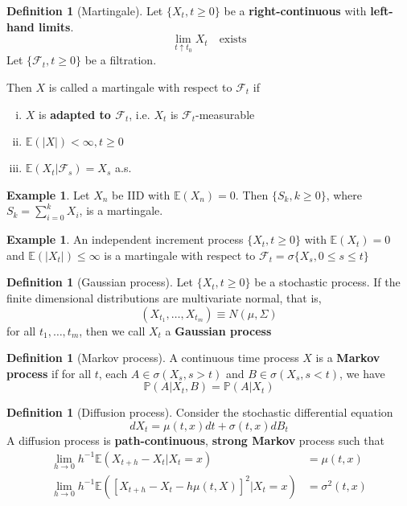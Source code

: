 \documentclass[10pt, oneside, reqno]{amsart}
\theoremstyle{plain}%
\theoremstyle{definition}
\newtheorem{defn}[thm]{Definition}
\newtheorem{exmp}[thm]{Example}
\theoremstyle{remark}
\renewcommand{\P}{\mathbb{P}}
\newcommand{\E}{\mathbb{E}}
\newcommand{\sigf}{\mathcal{F}}
\begin{document}
\begin{defn}[Martingale]
    Let $\{ X_t, t \geq 0 \}$ be a \textbf{right-continuous} with \textbf{left-hand limits}.  \[
        \lim_{t \uparrow t_0} X_t \quad \text{exists}
    \]
    Let $\{\sigf_t, t \geq 0 \} $ be a filtration.  
    
    Then $X$ is called a martingale with respect to $\sigf_t$ if 
    \begin{enumerate}[(i)]
        \item $X$ is \textbf{adapted to $\sigf_t$}, i.e. $X_t$ is $\sigf_t$-measurable
        \item $\E(|X|) < \infty, t \geq 0$
        \item $\E(X_t | \sigf_s) = X_s$ a.s.
    \end{enumerate}
\end{defn}

\begin{exmp}
    Let $X_n$ be IID with $\E(X_n) = 0$.  Then $\{ S_k, k \geq 0 \}$, where $S_k = \sum_{i = 0}^k X_i$, is a martingale.
\end{exmp}

\begin{exmp}
    An independent increment process $\{ X_t, t \geq 0 \}$ with $\E(X_t) = 0$ and $\E(|X_t|) \leq \infty$ is a martingale with respect to $\sigf_t = \sigma\{ X_s, 0 \leq s \leq t \}$
\end{exmp}

\begin{defn}[Gaussian process]
    Let $\{ X_t, t \geq 0 \}$ be a stochastic process.  If the finite dimensional distributions are multivariate normal, that is,\[
        (X_{t_1}, \dots, X_{t_m}) \equiv N(\mu, \Sigma)
    \]
    for all $t_1, \dots, t_m$, then we call $X_t$ a \textbf{Gaussian process}
\end{defn}

\begin{defn}[Markov process]
    A continuous time process $X$ is a \textbf{Markov process} if for all $t$, each $A \in \sigma( X_s, s > t)$ and $B \in \sigma( X_s, s < t)$, we have \[
        \P(A|X_t, B) = \P(A | X_t)
    \]
\end{defn}

\begin{defn}[Diffusion process]
    Consider the stochastic differential equation \[
    dX_t = \mu(t, x) dt + \sigma(t,x) dB_t
    \]
    A diffusion process is \textbf{path-continuous}, \textbf{strong Markov} process such that
    \begin{align*}
        \lim_{h \rightarrow 0} h^{-1} \E( X_{t+h} - X_t | X_t = x) &= \mu(t, x) \\
        \lim_{h \rightarrow 0} h^{-1} \E([X_{t+h} - X_t - h\mu(t, X)]^2 | X_t = x) &= \sigma^2(t, x)
    \end{align*}

\end{defn}
\end{document}
